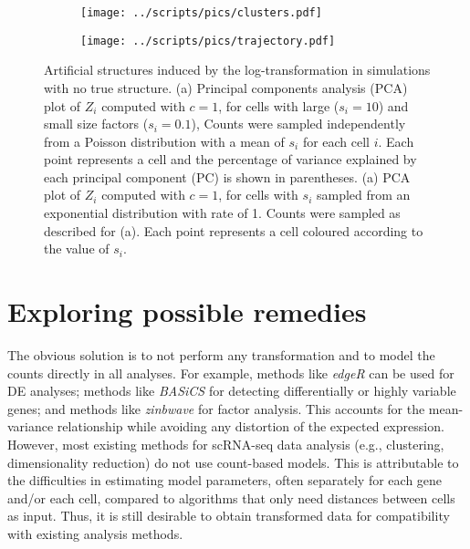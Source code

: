 \documentclass[10pt,letterpaper]{article}
\begin{document}
\begin{figure}[btp]
\centering
\begin{subfigure}[b]{0.49\textwidth}
    \texttt{[image: ../scripts/pics/clusters.pdf]}
    \caption{}
\end{subfigure}
\begin{subfigure}[b]{0.49\textwidth}
    \texttt{[image: ../scripts/pics/trajectory.pdf]}
    \caption{}
\end{subfigure}
\caption{Artificial structures induced by the log-transformation in simulations with no true structure.
(a) Principal components analysis (PCA) plot of $Z_i$ computed with $c=1$, for cells with large ($s_i =10$) and small size factors ($s_i=0.1$), 
Counts were sampled independently from a Poisson distribution with a mean of $s_i$ for each cell $i$. 
Each point represents a cell and the percentage of variance explained by each principal component (PC) is shown in parentheses. 
(a) PCA plot of $Z_i$ computed with $c=1$, for cells with $s_i$ sampled from an exponential distribution with rate of 1.
Counts were sampled as described for (a).
Each point represents a cell coloured according to the value of $s_i$.
}
\label{fig:structures}
\end{figure}

\section{Exploring possible remedies}
The obvious solution is to not perform any transformation and to model the counts directly in all analyses.
For example, methods like \textit{edgeR} \cite{robinson2010edgeR} can be used for DE analyses;
methods like \textit{BASiCS} \cite{vallejos2016beyond} for detecting differentially or highly variable genes;
and methods like \textit{zinbwave} \cite{risso2018general} for factor analysis.
This accounts for the mean-variance relationship while avoiding any distortion of the expected expression.
However, most existing methods for scRNA-seq data analysis (e.g., clustering, dimensionality reduction) do not use count-based models.
This is attributable to the difficulties in estimating model parameters, often separately for each gene and/or each cell,
compared to algorithms that only need distances between cells as input.
Thus, it is still desirable to obtain transformed data for compatibility with existing analysis methods.
\end{document}
